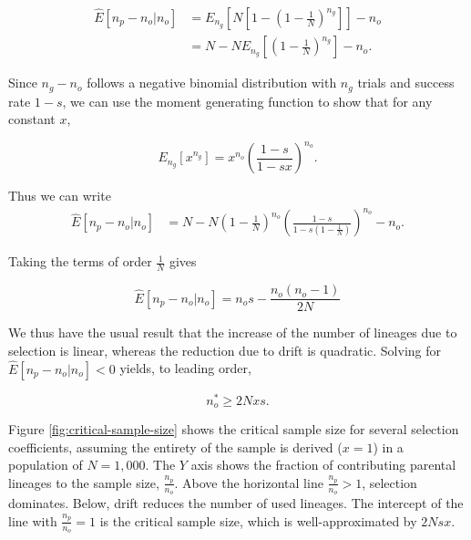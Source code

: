 \documentclass[review]{elsarticle}
\begin{document}
\begin{equation*}
  \begin{aligned}
    \label{eq:lineages-derive}
    \hat{E}[n_p -n_o | n_o] & =   E_{n_g}\left[N\left[1-\left( 1 - \frac{1}{N} \right)^{n_g} \right]\right]- n_o\\
    & =   N-N  E_{n_g}\left[\left( 1 - \frac{1}{N} \right)^{n_g} \right] -n_o. 
  \end{aligned}
\end{equation*}

Since $n_g-n_o$ follows a negative binomial distribution with $n_g$ trials and success rate $1-s$, we can use the moment generating function to show that for any constant $x$,

\begin{equation}
E_{n_g}[x^{n_g}] = x^{n_o}  \left(\frac{1-s}{1-sx}\right)^{n_o}.
\label{eq:identity}
\end{equation} 

Thus we can write 
\begin{equation*}
  \begin{aligned}
    \label{eq:lineages-exact}
    \hat{E}[n_p -n_o | n_o]    & =   N-N  \left( 1 - \frac{1}{N} \right)^{n_o}\left( \frac{1-s}{1-s \left( 1 - \frac{1}{N} \right)}\right)^{n_o}     -n_o.
  \end{aligned}
\end{equation*}

Taking the terms of order $\frac{1}{N}$ gives

\begin{equation*}
    \label{eq:lineages-approx}
    \hat{E}[n_p -n_o | n_o]    =   n_os - \frac{n_o (n_o-1) }{2N}  
\end{equation*}

We thus have the usual result that the increase of the number of lineages due to selection is
linear, whereas the reduction due to drift is quadratic. Solving for $ \hat{E}[n_p -n_o | n_o]<0$ yields, to leading order,

\begin{equation}
  \label{eq:critical-sample}
  n_o^* \ge 2Nxs.
\end{equation}

Figure \ref{fig:critical-sample-size} shows the critical sample size for several selection
coefficients, assuming the entirety of the sample is derived ($x=1$) in a population of $N=1,000$.
The $Y$ axis shows the fraction of contributing parental lineages to the sample size,
$\frac{n_p}{n_o}$. Above the horizontal line $\frac{n_p}{n_o} > 1$, selection dominates. Below,
drift reduces the number of used lineages. The intercept of the line with $\frac{n_p}{n_o} = 1$ is
the critical sample size, which is well-approximated by $2Nsx$.
\end{document}
